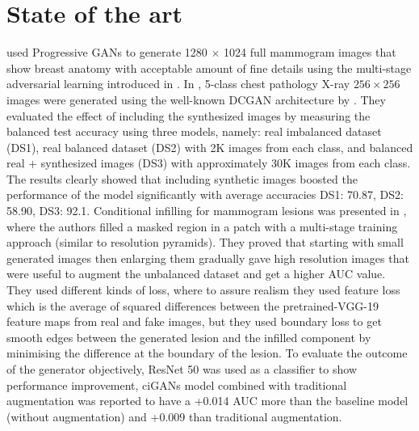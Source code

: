 \documentclass[final,3p,twocolumn,authoryear,sort&compress,times]{maia}
\begin{document}
\section{State of the art}
\label{sec:stateoftheart}
\citet{highresol_mammoGAN} used Progressive GANs to generate 1280 $\times$ 1024 full mammogram images that show breast anatomy with acceptable amount of fine details using the multi-stage adversarial learning introduced in \citep{progressive_GAN}. In \citet{lung_GANs}, 5-class chest pathology X-ray $256 \times 256$ images were generated using the well-known DCGAN architecture by \citet{radford_DCGAN}. They evaluated the effect of including the synthesized images by measuring the balanced test accuracy using three models, namely: real imbalanced dataset (DS1), real balanced dataset (DS2) with 2K images from each class, and balanced real + synthesized images (DS3) with approximately 30K images from each class. The results clearly showed that including synthetic images boosted the performance of the model significantly with average accuracies DS1: 70.87, DS2: 58.90, DS3: 92.1. Conditional infilling for mammogram lesions was presented in \citet{ciGANs}, where the authors filled a masked region in a patch with a multi-stage training approach (similar to resolution pyramids). They proved that starting with small generated images then enlarging them gradually gave high resolution images that were useful to augment the unbalanced dataset and get a higher AUC value. They used different kinds of loss, where to assure realism they used feature loss which is the average of squared differences between the pretrained-VGG-19 feature maps from real and fake images, but they used boundary loss to get smooth edges between the generated lesion and the infilled component by minimising the difference at the boundary of the lesion. To evaluate the outcome of the generator objectively, ResNet 50 was used as a classifier to show performance improvement, ciGANs model combined with traditional augmentation was reported to have a +0.014 AUC more than the baseline model (without augmentation) and +0.009 than traditional augmentation.
\end{document}
